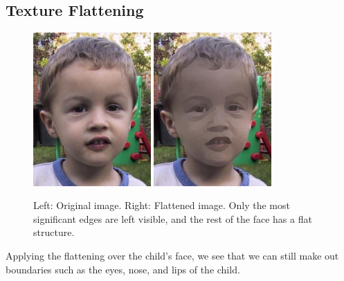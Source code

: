 \documentclass[12pt]{article}
\begin{document}
\subsection{Texture Flattening}
\noindent\begin{figure}[H]
\centering
\includegraphics[width=0.4\textwidth,keepaspectratio]{data/TextureFlattening/child/child.jpg}
\includegraphics[width=0.4\textwidth,keepaspectratio]{data/TextureFlattening/child/texture_flatten.jpg}
\caption{Left: Original image. Right: Flattened image. Only the most significant edges are left visible, and the rest of the face has a flat structure.}
\label{child}
\end{figure}
Applying the flattening over the child's face, we see that we can still make out boundaries such as the eyes, nose, and lips of the child. 
\end{document}
